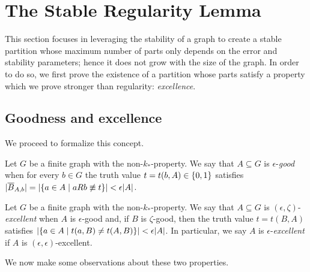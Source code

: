 \section{The Stable Regularity Lemma} \label{sec:section_5}

    This section focuses in leveraging the stability of a graph to create a stable partition whose maximum number
    of parts only depends on the error and stability parameters; hence it does not grow with the size of the graph.
    In order to do so, we first prove the existence of a partition whose parts satisfy a property which we prove stronger
    than regularity: \emph{excellence}.

    \subsection{Goodness and excellence} \label{subsec:subsection_5.1}

        We proceed to formalize this concept.

        \begin{definition} \label{def:epsilon_good}
            Let $G$ be a finite graph with the non-$k_*$-property.
            We say that $A \subseteq G$ is $\epsilon$-\emph{good} when for every $b \in G$ the truth value
            $t = t(b, A) \in \{ 0, 1 \}$ satisfies
            $| \overline{B}_{A,b} | = | \{ a\in A \mid aRb \not\equiv t \} | < \epsilon |A|$.
        \end{definition}

        \begin{definition} \label{def:epsilon_excellent}
            Let $G$ be a finite graph with the non-$k_*$-property.
            We say that $A \subseteq G$ is $(\epsilon, \zeta)$-\emph{excellent} when $A$ is $\epsilon$-good and, if $B$ is
            $\zeta$-good, then the truth value $t = t(B,A)$ satisfies $| \{ a \in A \mid t(a,B) \neq t(A,B) \} | < \epsilon |A|$.
            In particular, we say $A$ is $\epsilon$-\emph{excellent} if $A$ is $(\epsilon, \epsilon)$-excellent.
        \end{definition}

        We now make some observations about these two properties.

